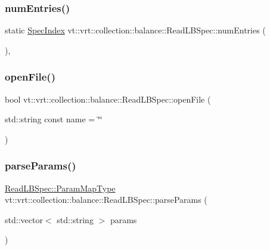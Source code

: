 \subsubsection{\texorpdfstring{num\+Entries()}{numEntries()}}
{\footnotesize\ttfamily static \hyperlink{namespacevt_1_1vrt_1_1collection_1_1balance_a72a5e0d9936ddf57f8e6c64e0e9fd123}{Spec\+Index} vt\+::vrt\+::collection\+::balance\+::\+Read\+L\+B\+Spec\+::num\+Entries (\begin{DoxyParamCaption}{ }\end{DoxyParamCaption})\hspace{0.3cm}{\ttfamily [inline]}, {\ttfamily [static]}}

\mbox{\label{structvt_1_1vrt_1_1collection_1_1balance_1_1_read_l_b_spec_a17dc2fc7785cd6519440c080a472af05}} 
\subsubsection{\texorpdfstring{open\+File()}{openFile()}}
{\footnotesize\ttfamily bool vt\+::vrt\+::collection\+::balance\+::\+Read\+L\+B\+Spec\+::open\+File (\begin{DoxyParamCaption}\item[{std\+::string const}]{name = {\ttfamily \char`\"{}\char`\"{}} }\end{DoxyParamCaption})\hspace{0.3cm}{\ttfamily [static]}}

\mbox{\label{structvt_1_1vrt_1_1collection_1_1balance_1_1_read_l_b_spec_a69993cae4576e25d70929e95dad81d7e}} 
\subsubsection{\texorpdfstring{parse\+Params()}{parseParams()}}
{\footnotesize\ttfamily \hyperlink{structvt_1_1vrt_1_1collection_1_1balance_1_1_read_l_b_spec_a01c2aa3a9e92be646c37f24afda6afa2}{Read\+L\+B\+Spec\+::\+Param\+Map\+Type} vt\+::vrt\+::collection\+::balance\+::\+Read\+L\+B\+Spec\+::parse\+Params (\begin{DoxyParamCaption}\item[{std\+::vector$<$ std\+::string $>$}]{params }\end{DoxyParamCaption})\hspace{0.3cm}{\ttfamily [static]}}

